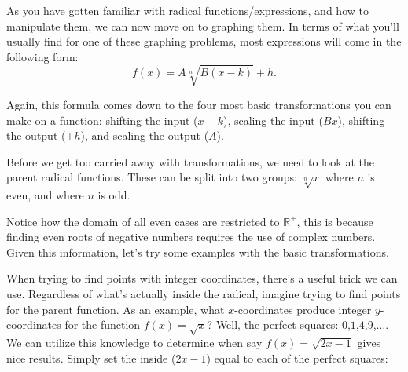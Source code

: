 \documentclass[../book.tex]{subfiles}
\begin{document}
As you have gotten familiar with radical functions/expressions, and how to manipulate them, we can now move on to graphing them. In terms of what you’ll usually find for one of these graphing problems, most expressions will come in the following form: $$f(x)=A\sqrt[n]{B(x-k)}+h.$$

Again, this formula comes down to the four most basic transformations you can make on a function: shifting the input ($x-k$), scaling the input ($Bx$), shifting the output ($+h$), and scaling the output ($A$).

Before we get too carried away with transformations, we need to look at the parent radical functions.  These can be split into two groups: $\sqrt[n]{x}$ where $n$ is even, and where $n$ is odd.

\begin{figure}[!h]
    \centering
     
\end{figure}

Notice how the domain of all even cases are restricted to $\mathbb{R}^+$, this is because finding even roots of negative numbers requires the use of complex numbers. Given this information, let’s try some examples with the basic transformations.

When trying to find points with integer coordinates, there’s a useful trick we can use. Regardless of what’s actually inside the radical, imagine trying to find points for the parent function. As an example, what $x$-coordinates produce integer $y$-coordinates for the function $f(x)=\sqrt{x}$? Well, the perfect squares: $0$,$1$,$4$,$9$,$\ldots$. We can utilize this knowledge to determine when say $f(x)=\sqrt{2x-1}$ gives nice results. Simply set the inside ($2x-1$) equal to each of the perfect squares:
\end{document}
